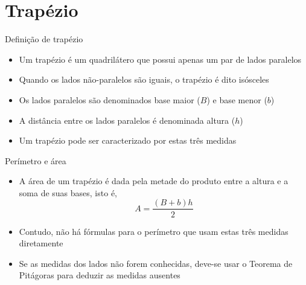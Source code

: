 \section{Trapézio}

\begin{frame}[fragile]{Definição de trapézio}

    \begin{itemize}
        \item Um trapézio é um quadrilátero que possui apenas um par de lados paralelos

        \item Quando os lados não-paralelos são iguais, o trapézio é dito isósceles

        \item Os lados paralelos são denominados base maior ($B$) e base menor ($b$)

        \item A distância entre os lados paralelos é denominada altura ($h$)

        \item Um trapézio pode ser caracterizado por estas três medidas

    \end{itemize}

    \begin{figure}
        \centering

    \end{figure}

\end{frame}

\begin{frame}[fragile]{Perímetro e área}

    \begin{itemize}
        \item A área de um trapézio é dada pela metade do produto entre a altura e a soma de
            suas bases, isto é,
        \[
            A = \frac{(B + b)h}{2}
        \]

        \item Contudo, não há fórmulas para o perímetro que usam estas três medidas diretamente

        \item Se as medidas dos lados não forem conhecidas, deve-se usar o Teorema de
            Pitágoras para deduzir as medidas ausentes
    \end{itemize}

\end{frame}
